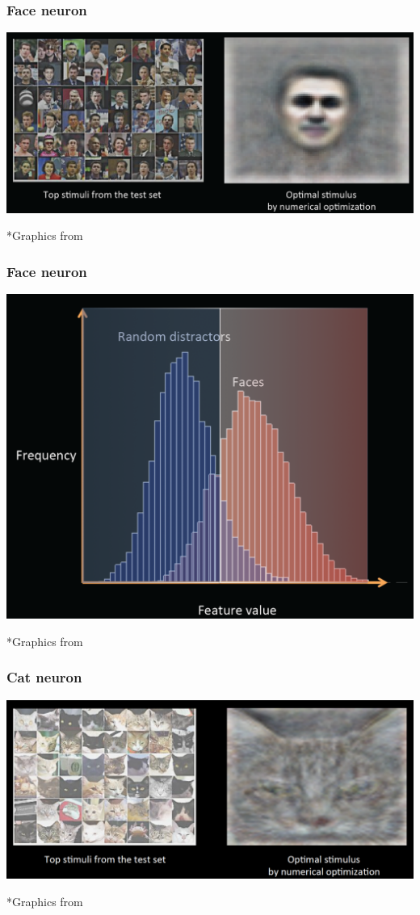 \documentclass{beamer}
\begin{document}

\begin{frame}
\frametitle{Face neuron}
\centerline{\includegraphics[scale=0.2]{figs/le12face}}
*Graphics from \cite{le12highlevel}
\end{frame}

\begin{frame}
\frametitle{Face neuron}
\centerline{\includegraphics[scale=0.2]{figs/le12face_histogram}}
*Graphics from \cite{le12highlevel}
\end{frame}

\begin{frame}
\frametitle{Cat neuron}
\centerline{\includegraphics[scale=0.2]{figs/le12cat}}
*Graphics from \cite{le12highlevel}
\end{frame}
\end{document}
